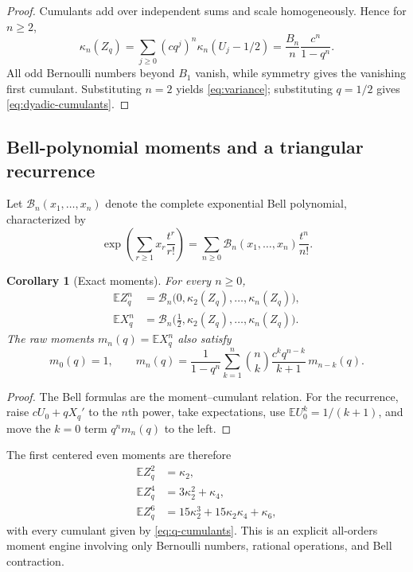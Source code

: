\documentclass[11pt,oneside]{article}
\newtheorem{corollary}[theorem]{Corollary}
\theoremstyle{definition}
\theoremstyle{remark}
\newcommand{\E}{\mathbb E}
\begin{document}
\begin{proof}
Cumulants add over independent sums and scale homogeneously.  Hence for $n\ge2$,
\[
 \kappa_n(Z_q)
 =\sum_{j\ge0}(cq^j)^n\kappa_n(U_j-1/2)
 =\frac{B_n}{n}\frac{c^n}{1-q^n}.
\]
All odd Bernoulli numbers beyond $B_1$ vanish, while symmetry gives the vanishing first
cumulant.  Substituting $n=2$ yields \eqref{eq:variance}; substituting $q=1/2$ gives
\eqref{eq:dyadic-cumulants}.
\end{proof}

\subsection{Bell-polynomial moments and a triangular recurrence}

Let $\mathcal B_n(x_1,\ldots,x_n)$ denote the complete exponential Bell polynomial,
characterized by
\[
 \exp\left(\sum_{r\ge1}x_r\frac{t^r}{r!}\right)
 =\sum_{n\ge0}\mathcal B_n(x_1,\ldots,x_n)\frac{t^n}{n!}.
\]

\begin{corollary}[Exact moments]
\label{cor:bell-moments}
For every $n\ge0$,
\begin{align}
 \E Z_q^n
 &=\mathcal B_n\bigl(0,\kappa_2(Z_q),\ldots,\kappa_n(Z_q)\bigr),  \label{eq:centered-bell}\\
 \E X_q^n
 &=\mathcal B_n\bigl(\tfrac12,\kappa_2(Z_q),\ldots,\kappa_n(Z_q)\bigr). \label{eq:raw-bell}
\end{align}
The raw moments $m_n(q)=\E X_q^n$ also satisfy
\begin{equation}
 m_0(q)=1,
 \qquad
 m_n(q)=\frac{1}{1-q^n}
 \sum_{k=1}^{n}\binom nk\frac{c^kq^{n-k}}{k+1}\,m_{n-k}(q).  \label{eq:moment-recurrence}
\end{equation}
\end{corollary}

\begin{proof}
The Bell formulas are the moment--cumulant relation.  For the recurrence, raise
$cU_0+qX_q'$ to the $n$th power, take expectations, use $\E U_0^k=1/(k+1)$, and move the
$k=0$ term $q^nm_n(q)$ to the left.
\end{proof}

The first centered even moments are therefore
\begin{align*}
 \E Z_q^2&=\kappa_2,\\
 \E Z_q^4&=3\kappa_2^2+\kappa_4,\\
 \E Z_q^6&=15\kappa_2^3+15\kappa_2\kappa_4+\kappa_6,
\end{align*}
with every cumulant given by \eqref{eq:q-cumulants}.  This is an explicit all-orders moment
engine involving only Bernoulli numbers, rational operations, and Bell contraction.
\end{document}
